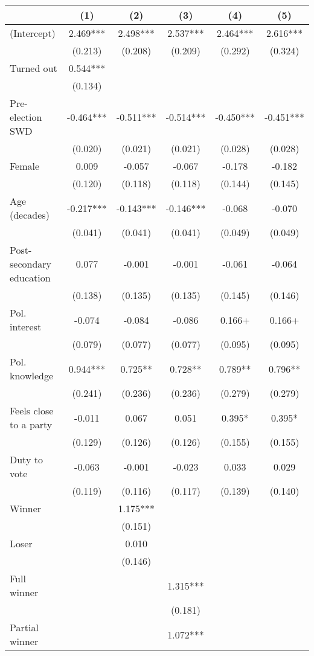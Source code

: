 \begin{table}
\centering
\begin{tabular}[t]{lccccc}
\toprule
  & (1) & (2) & (3) & (4) & (5)\\
\midrule
(Intercept) & 2.469*** & 2.498*** & 2.537*** & 2.464*** & 2.616***\\
 & (0.213) & (0.208) & (0.209) & (0.292) & (0.324)\\
Turned out & 0.544*** &  &  &  & \\
 & (0.134) &  &  &  & \\
Pre-election SWD & -0.464*** & -0.511*** & -0.514*** & -0.450*** & -0.451***\\
 & (0.020) & (0.021) & (0.021) & (0.028) & (0.028)\\
Female & 0.009 & -0.057 & -0.067 & -0.178 & -0.182\\
 & (0.120) & (0.118) & (0.118) & (0.144) & (0.145)\\
Age (decades) & -0.217*** & -0.143*** & -0.146*** & -0.068 & -0.070\\
 & (0.041) & (0.041) & (0.041) & (0.049) & (0.049)\\
Post-secondary education & 0.077 & -0.001 & -0.001 & -0.061 & -0.064\\
 & (0.138) & (0.135) & (0.135) & (0.145) & (0.146)\\
Pol. interest & -0.074 & -0.084 & -0.086 & 0.166+ & 0.166+\\
 & (0.079) & (0.077) & (0.077) & (0.095) & (0.095)\\
Pol. knowledge & 0.944*** & 0.725** & 0.728** & 0.789** & 0.796**\\
 & (0.241) & (0.236) & (0.236) & (0.279) & (0.279)\\
Feels close to a party & -0.011 & 0.067 & 0.051 & 0.395* & 0.395*\\
 & (0.129) & (0.126) & (0.126) & (0.155) & (0.155)\\
Duty to vote & -0.063 & -0.001 & -0.023 & 0.033 & 0.029\\
 & (0.119) & (0.116) & (0.117) & (0.139) & (0.140)\\
Winner &  & 1.175*** &  &  & \\
 &  & (0.151) &  &  & \\
Loser &  & 0.010 &  &  & \\
 &  & (0.146) &  &  & \\
Full winner &  &  & 1.315*** &  & \\
 &  &  & (0.181) &  & \\
Partial winner &  &  & 1.072*** &  & \\

\end{tabular}
\end{table}
